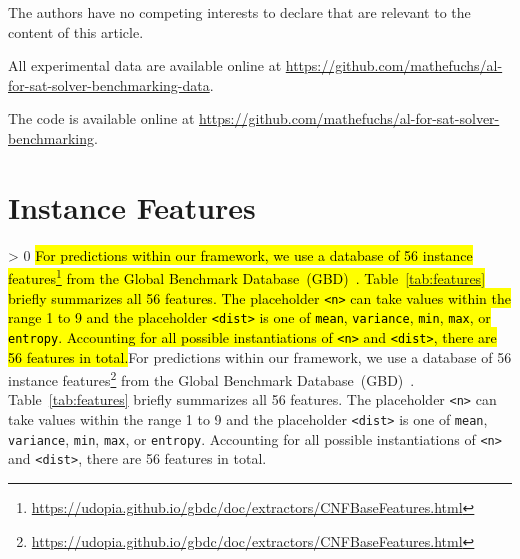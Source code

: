 \documentclass[sn-basic, Numbered]{sn-jnl} %
\newcommand{\showchanges}{1} %
\newcommand{\change}[1]{\ifnum \showchanges > 0 \sethlcolor{yellow}\hl{#1}\else#1\fi}
\begin{document}

The authors have no competing interests to declare that are relevant to the content of this article.


All experimental data are available online at \url{https://github.com/mathefuchs/al-for-sat-solver-benchmarking-data}.


The code is available online at \url{https://github.com/mathefuchs/al-for-sat-solver-benchmarking}.



%
%

\newpage
\appendix
\section{Instance Features}
\label{sec:appendix-features}

\change{For predictions within our framework, we use a database of 56 instance features\footnote{\url{https://udopia.github.io/gbdc/doc/extractors/CNFBaseFeatures.html}} from the Global Benchmark Database~(GBD)~\cite{IserJ24}.
Table~\ref{tab:features} briefly summarizes all 56 features.
The placeholder \texttt{<n>} can take values within the range 1 to 9 and the placeholder \texttt{<dist>} is one of \texttt{mean}, \texttt{variance}, \texttt{min}, \texttt{max}, or \texttt{entropy}.
Accounting for all possible instantiations of \texttt{<n>} and \texttt{<dist>}, there are 56 features in total.}
\end{document}
